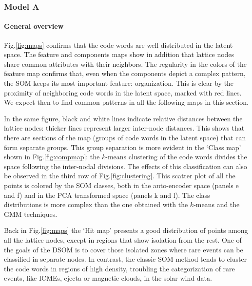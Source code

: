 \subsubsection{Model A}

\paragraph{General overview}

Fig.\ref{fig:maps} confirms that the code words are well distributed in the latent space. The feature and components maps show in addition that lattice nodes share common attributes with their neighbors. The regularity in the colors of the feature map confirms that, even when the components depict a complex pattern, the SOM keeps its most important feature: organization. This is clear by the proximity of neighboring code words in the latent space, marked with red lines. We expect then to find common patterns in all the following maps in this section.

In the same figure, black and white lines indicate relative distances between the lattice nodes: thicker lines represent larger inter-node distances. This shows that there are sections of the map (groups of code words in the latent space) that can form separate groups. This group separation is more evident in the `Class map' shown in Fig.\ref{fig:compmap}: the $k$-means clustering of the code words divides the space following the inter-nodal divisions. The effects of this classification can also be observed in the third row of Fig.\ref{fig:clustering}. This scatter plot of all the points is colored by the SOM classes, both in the auto-encoder space (panels e and f) and in the PCA transformed space (panels k and l). The class distributions is more complex than the one obtained with the $k$-means and the GMM techniques.

Back in Fig.\ref{fig:maps} the `Hit map' presents a good distribution of points among all the lattice nodes, except in regions that show isolation from the rest. One of the goals of the DSOM is to cover those isolated zones where rare events can be classified in separate nodes. In contrast, the classic SOM method tends to cluster the code words in regions of high density, troubling the categorization of rare events, like ICMEs, ejecta or magnetic clouds, in the solar wind data.


